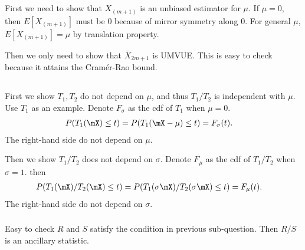 \subsection{} %

First we need to show that $X_{(m+1)}$ is an unbiased estimator for $\mu$.
If $\mu=0$, then $E[X_{(m+1)}]$ must be $0$ because of mirror symmetry along $0$.
For general $\mu$, $E[X_{(m+1)}]=\mu$ by translation property.

Then we only need to show that $\bar{X}_{2m+1}$ is UMVUE.
This is easy to check because it attains the Cram\'er-Rao bound.

\subsection{} %

\subsubsection{} %

First we show $T_1, T_2$ do not depend on $\mu$,
and thus $T_1/T_2$ is independent with $\mu$.
Use $T_1$ as an example.
Denote $F_\sigma$ as the cdf of $T_1$ when $\mu=0$.
\begin{align}
    P(T_1(\mX)\le t)
        &= P(T_1(\mX-\mu)\le t) = F_\sigma(t).
\end{align}
The right-hand side do not depend on $\mu$.

Then we show $T_1/T_2$ does not depend on $\sigma$.
Denote $F_\mu$ as the cdf of $T_1/T_2$ when $\sigma=1$.
then
\begin{align}
    P(T_1(\mX)/T_2(\mX)\le t)
        &= P(T_1(\sigma\mX)/T_2(\sigma\mX)\le t)
        = F_\mu (t).
\end{align}
The right-hand side do not depend on $\sigma$.

\subsubsection{} %

Easy to check $R$ and $S$ satisfy the condition in previous sub-question.
Then $R/S$ is an ancillary statistic.

\subsection{} %

